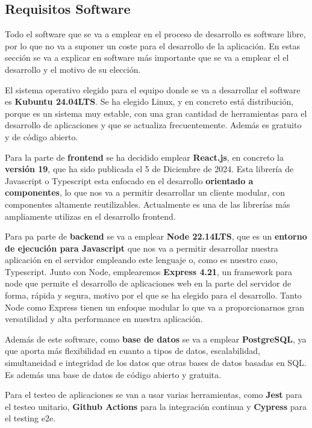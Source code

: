 \subsection{Requisitos Software}
Todo el software que se va a emplear en el proceso de desarrollo es software libre, por lo que no va a suponer un coste para el desarrollo de la aplicación. En estas sección se va a explicar en software más importante que se va a emplear el el desarrollo y el motivo de su elección.

El sistema operativo elegido para el equipo donde se va a desarrollar el software es \textbf{Kubuntu 24.04LTS}. Se ha elegido Linux, y en concreto está distribución, porque es un sistema muy estable, con una gran cantidad de herramientas para el desarrollo de aplicaciones y que se actualiza frecuentemente. Además es gratuito y de código abierto.

Para la parte de \textbf{frontend} se ha decidido emplear \textbf{React.js}, en concreto la \textbf{versión 19}, que ha sido publicada el 5 de Diciembre de 2024. \cite{github01} Esta librería de Javascript o Typescript esta enfocado en el desarrollo \textbf{orientado a componentes}, lo que nos va a permitir desarrollar un cliente modular, con componentes altamente reutilizables. Actualmente es una de las librerías más ampliamente utilizas en el desarrollo frontend.

Para pa parte de \textbf{backend} se va a emplear \textbf{Node 22.14LTS}, que es un \textbf{entorno de ejecución para Javascript} que nos va a permitir desarrollar nuestra aplicación en el servidor empleando este lenguaje o, como es nuestro caso, Typescript. Junto con Node, emplearemos \textbf{Express 4.21}, un framework para node que permite el desarrollo de aplicaciones web en la parte del servidor de forma, rápida y segura, motivo por el que se ha elegido para el desarrollo. Tanto Node como Express tienen un enfoque modular lo que va a proporcionarnos gran versatilidad y alta performance en nuestra aplicación.

Además de este software, como \textbf{base de datos} se va a emplear \textbf{PostgreSQL}, ya que aporta más flexibilidad en cuanto a tipos de datos, escalabilidad, simultaneidad e integridad de los datos que otras bases de datos basadas en SQL. Es además una base de datos de código abierto y gratuita.

Para el testeo de aplicaciones se van a usar varias herramientas, como \textbf{Jest} para el testeo unitario, \textbf{Github Actions} para la integración continua y \textbf{Cypress} para el testing e2e.

